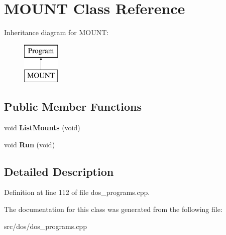 \hypertarget{classMOUNT}{\section{M\-O\-U\-N\-T Class Reference}
\label{classMOUNT}
}
Inheritance diagram for M\-O\-U\-N\-T\-:\begin{figure}[H]
\begin{center}
\leavevmode
\includegraphics[height=2.000000cm]{classMOUNT}
\end{center}
\end{figure}
\subsection*{Public Member Functions}
\begin{DoxyCompactItemize}
\item 
\hypertarget{classMOUNT_a162c6c15860f047f90e4a632cd80f769}{void {\bfseries List\-Mounts} (void)}\label{classMOUNT_a162c6c15860f047f90e4a632cd80f769}

\item 
\hypertarget{classMOUNT_aecbba89c92ac2fbd78a929ed04818d58}{void {\bfseries Run} (void)}\label{classMOUNT_aecbba89c92ac2fbd78a929ed04818d58}

\end{DoxyCompactItemize}


\subsection{Detailed Description}


Definition at line 112 of file dos\-\_\-programs.\-cpp.



The documentation for this class was generated from the following file\-:\begin{DoxyCompactItemize}
\item 
src/dos/dos\-\_\-programs.\-cpp\end{DoxyCompactItemize}
